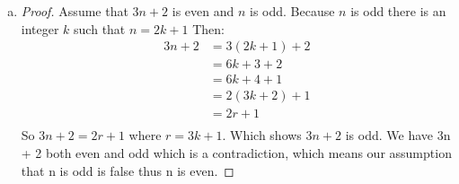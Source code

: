\begin{itemize}
\begin{enumerate}[a.]
              \item
                    \begin{proof}
                        Assume that $3n + 2$ is even and $n$ is odd. Because $n$ is odd there is an integer $k$ such that $n = 2k + 1$
                        Then:
                        \begin{align*}
                            3n + 2 & = 3(2k + 1)  + 2 \\
                                   & = 6k + 3 + 2     \\
                                   & = 6k + 4 + 1     \\
                                   & = 2(3k + 2) + 1  \\
                                   & = 2r + 1         \\
                        \end{align*}
                        So $3n + 2 = 2r + 1$ where $r = 3k + 1$. Which shows $3n + 2$ is odd.
                        We have 3n + 2 both even and odd which is a contradiction, which means our assumption that n is odd is false thus n is even.
                    \end{proof}
          \end{enumerate}
    

\end{itemize}
